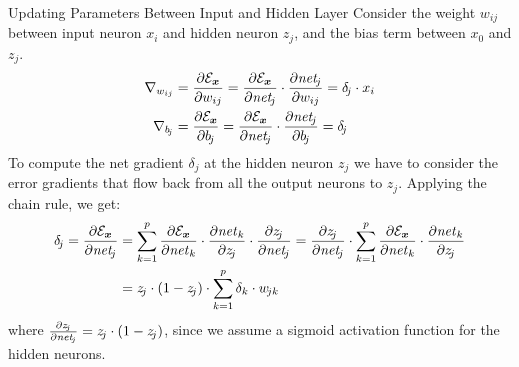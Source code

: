 \begin{frame}{Updating Parameters Between Input and Hidden Layer}
Consider the weight $w_{ij}$ between input neuron $x_i$ and
hidden neuron $z_{\!j}$, and the bias term between $x_0$ and
$z_{\!j}$. 
\begin{align}
    \begin{aligned}
    \grad_{w_{ij}} & = 
 \frac{\partial \cE_\bx}{\partial w_{ij}}
     = \frac{\partial \cE_\bx}{\partial \net_{\!j}} \cdot 
    \frac{\partial \net_{\!j}}{\partial w_{ij}}
    = \delta_{\!j}  \cdot x_i\\
    \grad_{b_{\!j}} & = 
 \frac{\partial \cE_\bx}{\partial b_{\!j}}
     = \frac{\partial \cE_\bx}{\partial \net_{\!j}} \cdot 
    \frac{\partial \net_{\!j}}{\partial b_{\!j}}
    = \delta_{\!j}
\end{aligned}
\label{eq:reg:neural:gradwij_ih}
\end{align}
%
To compute the net gradient $\delta_{\!j}$ 
at the hidden neuron $z_j$ we have to consider the error gradients that
flow back from all the output neurons to $z_j$.
Applying the chain rule, we get:
\begin{align*}
    \delta_{\!j} = \frac{\partial \cE_\bx}{\partial \net_{\!j}}
    & =
   \sum^{p}_{k=1} \frac{\partial \cE_\bx}{\partial \net_k} \cdot
   \frac{\partial \net_{k}}{\partial z_{\!j}} \cdot
\frac{\partial z_{\!j}}{\partial \net_{\!j}}
    =
\frac{\partial z_{\!j}}{\partial \net_{\!j}} \cdot
   \sum^{p}_{k=1} \frac{\partial \cE_\bx}{\partial \net_k} \cdot
   \frac{\partial \net_{k}}{\partial z_{\!j}} \\
& = z_{\!j} \cdot (1-z_{\!j}) \cdot \sum^{p}_{k=1} \delta_k \cdot w_{\!jk}
\end{align*}
where $\tfrac{\partial z_{\!j}}{\partial \mathit{net}_{\!j}} =
z_{\!j}\cdot(1-z_{\!j})$, since we assume a sigmoid activation function
for the hidden neurons.
\end{frame}
